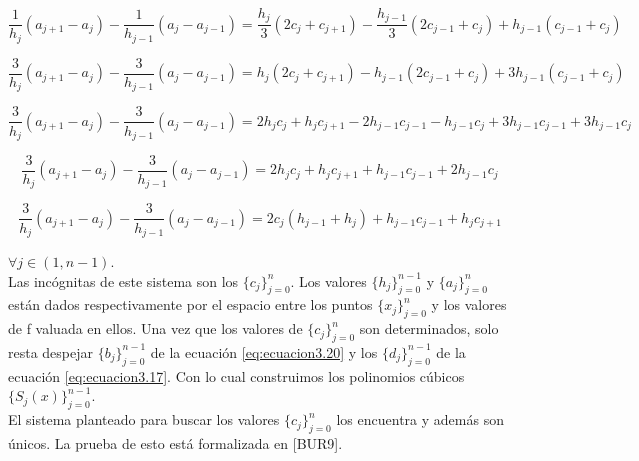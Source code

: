 $$ \frac{1}{h_{j}} (a_{j+1} - a_{j}) - \frac{1}{h_{j-1}} (a_{j} - a_{j-1}) = \frac{h_{j}}{3} (2c_{j} + c_{j+1}) - \frac{h_{j-1}}{3} (2c_{j-1} + c_{j}) + h_{j-1} (c_{j-1} + c_{j})$$

$$ \frac{3}{h_{j}} (a_{j+1} - a_{j}) - \frac{3}{h_{j-1}} (a_{j} - a_{j-1}) = h_{j} (2c_{j} + c_{j+1}) - h_{j-1} (2c_{j-1} + c_{j}) + 3h_{j-1} (c_{j-1} + c_{j}) $$

$$ \frac{3}{h_{j}} (a_{j+1} - a_{j}) - \frac{3}{h_{j-1}} (a_{j} - a_{j-1}) = 2h_{j}c_{j} + h_{j}c_{j+1} - 2h_{j-1}c_{j-1} - h_{j-1}c_{j} + 3h_{j-1}c_{j-1} + 3h_{j-1}c_{j} $$

$$ \frac{3}{h_{j}} (a_{j+1} - a_{j}) - \frac{3}{h_{j-1}} (a_{j} - a_{j-1}) = 2h_{j}c_{j} + h_{j}c_{j+1} + h_{j-1}c_{j-1} + 2h_{j-1}c_{j} $$

\begin{equation}\label{eq:ecuacion3.21}
 \frac{3}{h_{j}} (a_{j+1} - a_{j}) - \frac{3}{h_{j-1}} (a_{j} - a_{j-1}) = 2c_{j}(h_{j-1} + h_{j}) + h_{j-1}c_{j-1} + h_{j}c_{j+1} 
\end{equation}

$\forall j \in (1, n-1)$. \\

Las incógnitas de este sistema son los $\{c_{j}\}_{j=0}^{n}$. Los valores $\{ h_{j}\}_{j=0}^{n-1}$ y $\{ a_{j}\}_{j=0}^{n}$ están dados respectivamente por el espacio entre los puntos $\{x_{j}\}_{j=0}^{n}$ y los valores de f valuada en ellos. Una vez que los valores de $\{c_{j}\}_{j=0}^{n}$ son determinados, solo resta despejar $\{b_{j}\}_{j=0}^{n-1}$ de la ecuación \ref{eq:ecuacion3.20} y los $\{d_{j}\}_{j=0}^{n-1}$ de la ecuación \ref{eq:ecuacion3.17}. Con lo cual construimos los polinomios cúbicos $\{S_{j}(x)\}_{j=0}^{n-1}$. \\

El sistema planteado para buscar los valores $\{c_{j}\}_{j=0}^{n}$ los encuentra y además son únicos. La prueba de esto está formalizada en [BUR9].